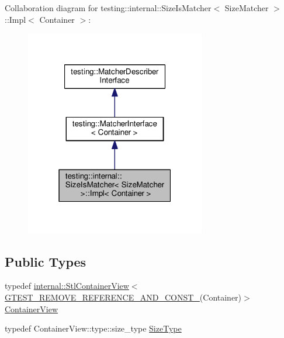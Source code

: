 Collaboration diagram for testing\+:\+:internal\+:\+:Size\+Is\+Matcher$<$ Size\+Matcher $>$\+:\+:Impl$<$ Container $>$\+:
\nopagebreak
\begin{figure}[H]
\begin{center}
\leavevmode
\includegraphics[width=223pt]{classtesting_1_1internal_1_1SizeIsMatcher_1_1Impl__coll__graph}
\end{center}
\end{figure}
\subsection*{Public Types}
\begin{DoxyCompactItemize}
\item 
typedef \hyperlink{classtesting_1_1internal_1_1StlContainerView}{internal\+::\+Stl\+Container\+View}$<$ \hyperlink{gtest-internal_8h_a874567b176266188fabfffb8393267ce}{G\+T\+E\+S\+T\+\_\+\+R\+E\+M\+O\+V\+E\+\_\+\+R\+E\+F\+E\+R\+E\+N\+C\+E\+\_\+\+A\+N\+D\+\_\+\+C\+O\+N\+S\+T\+\_\+}(Container)$>$ \hyperlink{classtesting_1_1internal_1_1SizeIsMatcher_1_1Impl_ae848755998eaaaa5e38366a2fc8b55e2}{Container\+View}
\item 
typedef Container\+View\+::type\+::size\+\_\+type \hyperlink{classtesting_1_1internal_1_1SizeIsMatcher_1_1Impl_a5548da0c4c2245ca2fb520f44f0a687a}{Size\+Type}
\end{DoxyCompactItemize}
